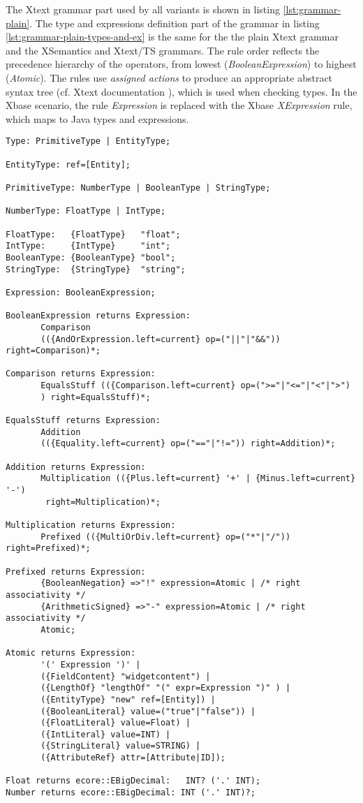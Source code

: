 The Xtext grammar part used by all variants is shown in listing
\ref{lst:grammar-plain}. The type and expressions definition part of the grammar
in listing \ref{lst:grammar-plain-types-and-ex} is the same for the the plain
Xtext grammar and the XSemantics and Xtext/TS grammars. The rule order reflects
the precedence hierarchy of the operators, from lowest
(\emph{BooleanExpression}) to highest (\emph{Atomic}). The rules use
\emph{assigned actions} to produce an appropriate abstract syntax tree (cf.
Xtext documentation \cite{xtextdoc}), which is used when checking types.
In the Xbase scenario, the rule \emph{Expression} is replaced with the Xbase
\emph{XExpression} rule, which maps to Java types and expressions.
\begin{lstlisting}[language=xtext,label=lst:grammar-plain-types-and-ex,caption=Types
and Expressions.] Type: PrimitiveType | EntityType;

EntityType: ref=[Entity];

PrimitiveType: NumberType | BooleanType | StringType;

NumberType: FloatType | IntType;

FloatType:   {FloatType}   "float";
IntType:     {IntType}     "int";
BooleanType: {BooleanType} "bool";
StringType:	 {StringType}  "string";

Expression: BooleanExpression;

BooleanExpression returns Expression:
       Comparison
       (({AndOrExpression.left=current} op=("||"|"&&")) right=Comparison)*;

Comparison returns Expression:
       EqualsStuff (({Comparison.left=current} op=(">="|"<="|"<"|">")
       ) right=EqualsStuff)*;

EqualsStuff returns Expression:
       Addition 
       (({Equality.left=current} op=("=="|"!=")) right=Addition)*;

Addition returns Expression:
       Multiplication (({Plus.left=current} '+' | {Minus.left=current} '-') 
        right=Multiplication)*;

Multiplication returns Expression:
       Prefixed (({MultiOrDiv.left=current} op=("*"|"/")) right=Prefixed)*;

Prefixed returns Expression:
       {BooleanNegation} =>"!" expression=Atomic | /* right associativity */
       {ArithmeticSigned} =>"-" expression=Atomic | /* right associativity */
       Atomic;

Atomic returns Expression:
       '(' Expression ')' |
       ({FieldContent} "widgetcontent") |
       ({LengthOf} "lengthOf" "(" expr=Expression ")" ) |
       ({EntityType} "new" ref=[Entity]) | 
       ({BooleanLiteral} value=("true"|"false")) |
       ({FloatLiteral} value=Float) |
       ({IntLiteral} value=INT) |
       ({StringLiteral} value=STRING) |
       ({AttributeRef} attr=[Attribute|ID]);

Float returns ecore::EBigDecimal:   INT? ('.' INT);
Number returns ecore::EBigDecimal: INT ('.' INT)?;
\end{lstlisting}

